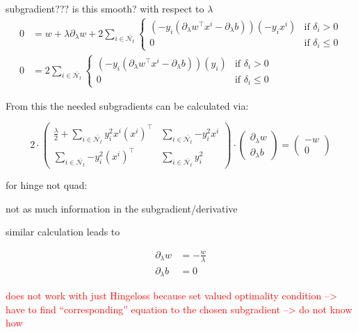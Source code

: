 subgradient??? is this smooth? with respect to \(\lambda\)
\begin{align}
	0 &= w+\lambda\partial_{\lambda}w+2\sum_{i \in \bar{\mathcal{N}_t}}{\left\{\begin{array}{cl} (-y_i(\partial_{\lambda}w^{\top}x^i-\partial_{\lambda}b))(-y_ix^i) & \text{if } \delta_i >0 \\ 0 & \text{if } \delta_i \leq 0 \end{array} \right.} \\
	0 &= 2\sum_{i \in \bar{\mathcal{N}_t}}{\left\{\begin{array}{cl} (-y_i(\partial_{\lambda}w^{\top}x^i-\partial_{\lambda}b))(y_i) & \text{if } \delta_i >0 \\ 0 & \text{if } \delta_i \leq 0 \end{array} \right.}
\end{align}

From this the needed subgradients can be calculated via:

\begin{equation}
	2\cdot\begin{pmatrix} \frac{\lambda}{2}+\sum_{i \in \bar{\mathcal{N}_t}}{y_i^2x^i(x^i)^{\top}} & \sum_{i \in \bar{\mathcal{N}_t}}	{-y_i^2x^i} \\ \sum_{i \in \bar{\mathcal{N}_t}}{-y_i^2(x^i)^{\top}} & \sum_{i \in \bar{\mathcal{N}_t}}{y_i^2}\end{pmatrix}
	\cdot \begin{pmatrix} \partial_{\lambda}w \\ \partial_{\lambda}b\end{pmatrix}
	= \begin{pmatrix}-w \\ 0\end{pmatrix}
\label{subgr_wb}
\end{equation}

for hinge not quad:

not as much information in the subgradient/derivative

similar calculation leads to 

\begin{align}
	\partial_{\lambda}w &= -\frac{w}{\lambda} \\
	\partial_{\lambda}b &= 0
\end{align}

\textcolor{red}{does not work with just Hingeloss because set valued optimality condition --> have to find ``corresponding'' equation to the chosen subgradient --> do not know how}

